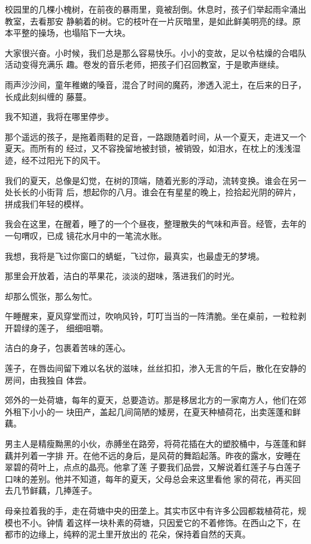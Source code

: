 		校园里的几棵小槐树，在前夜的暴雨里，竟被刮倒。休息时，孩子们举起雨伞涌出教室，去看那安
	静躺着的树。它的枝叶在一片灰暗里，是如此鲜美明亮的绿。原本平整的操场，也塌陷下一大块。

		大家很兴奋。小时候，我们总是那么容易快乐。小小的变故，足以令枯燥的合唱队活动变得充满乐
	趣。卷发的音乐老师，把孩子们召回教室，于是歌声继续。

		雨声沙沙间，童年稚嫩的嗓音，混合了时间的魔药，渗透入泥土，在后来的日子，长成此刻纠缠的
	藤蔓。

		我不知道，我将在哪里停步。

		那个遥远的孩子，是拖着雨鞋的足音，一路跟随着时间，从一个夏天，走进又一个夏天。而所有的
	经过，又不容挽留地被封锁，被销毁，如泪水，在枕上的浅浅湿迹，经不过阳光下的风干。

		我们的夏天，总像是幻觉，在树的顶端，随着光影的浮动，流转变换。谁会在另一处长长的小街背
	后，想起你的八月。谁会在有星星的晚上，捡拾起光阴的碎片，拼成我们年轻的模样。

		我会在这里，在醒着，睡了的一个个昼夜，整理散失的气味和声音。经管，去年的一句喟叹，已成
	镜花水月中的一笔流水账。

		我想，我将是飞过你窗口的蜻蜓，飞过你，最真实，也最虚无的梦境。

		那里会开放着，洁白的苹果花，淡淡的甜味，落进我们的时光。

		却那么慌张，那么匆忙。

	\endwriting



		午睡醒来，夏风穿堂而过，吹响风铃，叮叮当当的一阵清脆。坐在桌前，一粒粒剥开碧绿的莲子，
	细细咀嚼。

		洁白的身子，包裹着苦味的莲心。

		莲子，在唇齿间留下难以名状的滋味，丝丝扣扣，渗入无言的午后，散化在安静的房间，由我独自
	体尝。

		郊外的一处荷塘，每年的夏天，总要造访。那是移居北方的一家南方人，他们在郊外租下小小的一
	块田产，盖起几间简陋的矮房，在夏天种植荷花，出卖莲蓬和鲜藕。

		男主人是精瘦黝黑的小伙，赤膊坐在路旁，将荷花插在大的塑胶桶中，与莲蓬和鲜藕并列着一字排
	开。在他不远的身后，是风荷的舞蹈起落。昨夜的露水，安睡在翠碧的荷叶上，点点的晶亮。他拿了莲
	子要我们品尝，又解说着红莲子与白莲子口味的差别。他并不知道，每年的夏天，父母总会来这里看他
	家的荷花，再买回去几节鲜藕，几捧莲子。

		母亲拉着我的手，走在荷塘中央的田垄上。其实市区中有许多公园都栽植荷花，规模也不小。钟情
	着这样一块朴素的荷塘，只因爱它的不着修饰。在西山之下，在都市的边缘上，纯粹的泥土里开放出的
	花朵，保持着自然的天真。

